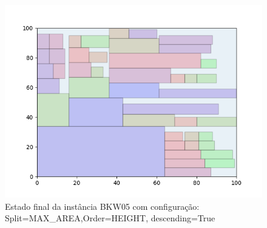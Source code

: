\begin{figure}[H]
    \centering
    \caption[]{Estado final da instância BKW05 com configuração: Split=MAX_AREA,Order=HEIGHT, descending=True}
    \label{fig:bkw05-max_area-height-true}
    \includegraphics[scale=0.5]{output/figures/bkw/bkw05/max_area/height/true/00}
\end{figure}